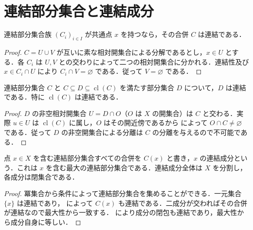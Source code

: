 \section{連結部分集合と連結成分}
\begin{prop}[共通点を持つ連結集合の合併]
連結部分集合族 $(C_i)_{i\in I}$ が共通点 $x$ を持つなら，その合併 $C$ は連結である．
\end{prop}
\begin{proof}
$C=U\cup V$ が互いに素な相対開集合による分解であるとし，$x\in U$ とする．各 $C_i$ は $U,V$ との交わりによって二つの相対開集合に分かれる．連結性及び $x\in C_i\cap U$ により $C_i\cap V=\varnothing$ である．従って $V=\varnothing$ である．
\end{proof}
\begin{prop}[連結集合の閉包]
連結部分集合 $C$ と $C\subseteq D\subseteq\operatorname{cl}(C)$ を満たす部分集合 $D$ について，$D$ は連結である．特に $\operatorname{cl}(C)$ は連結である．
\end{prop}
\begin{proof}
$D$ の非空相対開集合 $U=D\cap O$（$O$ は $X$ の開集合）は $C$ と交わる．実際 $u\in U$ は $\operatorname{cl}(C)$ に属し，$O$ はその開近傍であるから  によって $O\cap C\ne\varnothing$ である．従って $D$ の非空開集合による分離は $C$ の分離を与えるので不可能である．
\end{proof}
\begin{defn}[連結成分]
点 $x\in X$ を含む連結部分集合すべての合併を $C(x)$ と書き，$x$ の連結成分という．これは $x$ を含む最大の連結部分集合である．連結成分全体は $X$ を分割し，各成分は閉集合である．
\end{defn}
\begin{proof}
冪集合から条件によって連結部分集合を集めることができる．一元集合 $\{x\}$ は連結であり， によって $C(x)$ も連結である．二成分が交わればその合併が連結なので最大性から一致する． により成分の閉包も連結であり，最大性から成分自身に等しい．
\end{proof}
